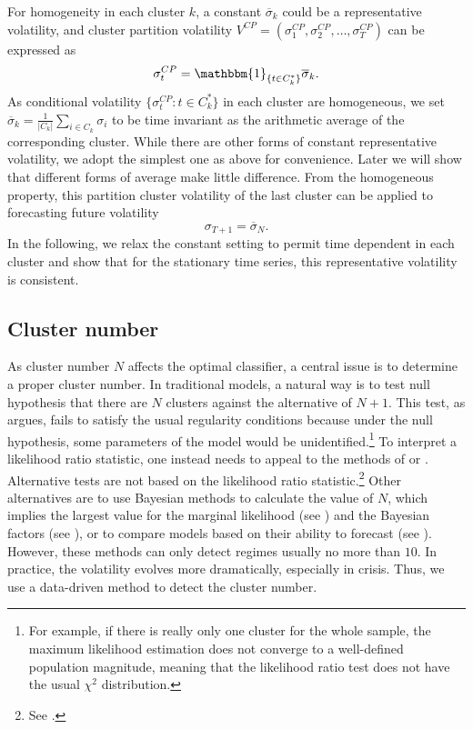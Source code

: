 \documentclass[preprint,12pt,authoryear]{elsarticle}
\begin{document}
For homogeneity in each cluster $k$, a constant $\overline{\sigma}_k$ could be a representative volatility, and cluster partition volatility $V^{CP}=(\sigma_1^{CP},\sigma_2^{CP},\dots,\sigma_T^{CP})$ can be expressed as
\begin{equation}\sigma_t^{CP}=\mathbbm{1}_{\{t\in C_k^{*}\}}\overline{\sigma}_k.
\end{equation}
As conditional volatility $\{\sigma_t^{CP}:t\in C_k^{*}\}$ in each cluster are homogeneous, we set $\overline{\sigma}_k=\frac{1}{|C_k|}\sum_{i\in C_k}\sigma_i$ to be time invariant as the arithmetic average of the corresponding cluster.
While there are other forms of constant representative volatility, we adopt the simplest
one as above for convenience.
Later we will show that different forms of average make little difference.
From the homogeneous property, this partition cluster volatility of the last cluster can be applied to forecasting future volatility
$$\sigma_{T+1}=\overline{\sigma}_N.$$
In the following, we relax the constant setting to permit time dependent in each cluster and show that for the stationary time series, this representative volatility is consistent.

\subsection{Cluster number}
As cluster number $N$ affects the optimal classifier, a central issue is
to determine a proper cluster number. In traditional models, a natural way is to test null hypothesis that there are $N$ clusters against the alternative of $N+1$.
This test, as \cite{Hamilton2010} argues, fails to satisfy the usual regularity conditions because under the null hypothesis, some parameters of the model would be unidentified.\footnote{For example, if there is really only one cluster for the whole sample, the maximum likelihood estimation does not converge to a well-defined population magnitude, meaning that the likelihood ratio test does not have the usual $\chi^2$ distribution.} To interpret a likelihood ratio statistic, one instead needs to appeal to the methods of \cite{Hansen1992} or \cite{Garcia1998}.
	Alternative tests are not based on the likelihood ratio statistic.\footnote{See \cite{Carrasco2014}.}
	Other alternatives are to use Bayesian methods to calculate the value of $N$, which implies the largest value for the marginal likelihood (see \cite{Liu2008}) and the
	Bayesian factors (see \cite{Koop2009}), or to compare models based on their ability to forecast (see \cite{Hamilton1994}).
	However, these methods can only detect regimes usually no more than $10$. In practice, the volatility evolves more dramatically, especially in crisis.
	Thus, we use a data-driven method to detect the cluster number.
\end{document}
